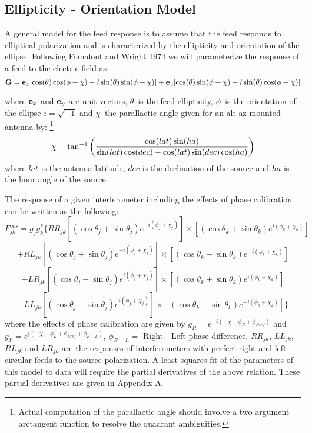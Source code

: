 \subsection {Ellipticity - Orientation Model}

   A general model for the feed response is to assume that the feed
responds to elliptical polarization and is characterized by the
ellipticity and orientation of the ellipse.  Following Fomalont and
Wright 1974 we will parameterize the response of a feed to the
electric field as:
$$ {\bf G} = {\bf e} _x [\cos (\theta )\cos (\phi
+\chi ) - i \sin (\theta )\sin (\phi +\chi )] + {\bf e} _y [\cos
(\theta ) \sin (\phi + \chi ) + i \sin (\theta )\cos (\phi + \chi )]
$$

where ${\bf e}_x$ and ${\bf e}_y$ are unit vectors, $\theta\,$ is the
feed ellipticity, $\phi\,$ is the orientation of the ellipse $i =
\sqrt{-1}$ and $\chi\,$ the parallactic angle given for an alt-az
mounted antenna by:
\footnote{Actual computation of the parallactic angle should involve a
two argument arctangent function to resolve the quadrant ambiguities.}
  $$\chi = \tan^{-1} \left({{\cos (lat) \sin (ha)} \over {\sin (lat)
\cos (dec) -\cos (lat) \sin (dec) \cos (ha)}}\right) $$
where $lat$ is the antenna latitude, $dec$ is the declination of the
source and $ha$ is the hour angle of the source.


   The response of a given interferometer including the effects of
phase calibration can be written as the following:
$$ F^{obs}_{jk} = g_j g_k^*\{RR_{jk}[(\cos \theta_j +
\sin\theta_j)e^{-i(\phi_j+\chi_j)}] \times [(\cos \theta_k + \sin \theta_k)
e^{i(\phi_k+\chi_k)}] $$
$$ + RL_{jk}[(\cos \theta_j + \sin \theta_j)
e^{-i(\phi_j+\chi_j)}] \times [(\cos \theta_k - \sin \theta_k)
e^{-i(\phi_k+\chi_k)}]$$
$$ + LR_{jk}[(\cos \theta_j - \sin \theta_j)
e^{ i(\phi_j+\chi_j)}] \times [(\cos \theta_k + \sin \theta_k) e^{
i(\phi_k+\chi_k)}]$$
$$ + LL_{jk}[(\cos \theta_j - \sin \theta_j) e^{
i(\phi_j+\chi_j)}] \times [(\cos \theta_k - \sin \theta_k)
e^{-i(\phi_k+\chi_2)}]\} $$
where the effects of phase calibration are
given by $g_R = e^{-i(-\chi - \phi_R + \phi_{Rref})}$ and $g_L = e^{
i(-\chi - \phi_L +
\phi_{Lref} + \phi_{R-L})}$, $\phi_{R-L} = $ Right - Left phase
difference, $RR_{jk}$, $LL_{jk}$, $RL_{jk}$ and $LR_{jk}$ are the
responses of interferometers with perfect right and left circular
feeds to the source polarization.
A least squares fit of the parameters of this model to data will
require the partial derivatives of the above relation.  These partial
derivatives are given in Appendix A.


